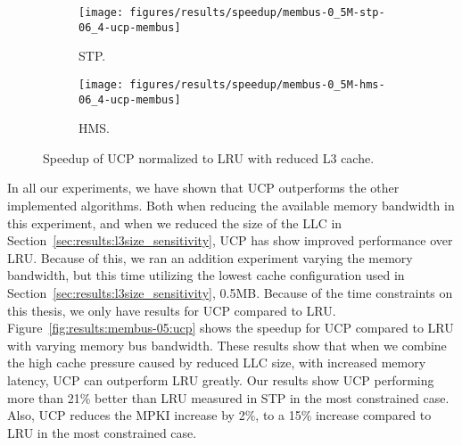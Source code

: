 \begin{figure}[t]
    \centering
        \begin{subfigure}[b]{0.5\textwidth}
            \texttt{[image: figures/results/speedup/membus-0\_5M-stp-06\_4-ucp-membus]}
            \caption{STP.}
            \label{fig:results:bus-05:ucp:stp}
        \end{subfigure}%
        \begin{subfigure}[b]{0.5\textwidth}
            \texttt{[image: figures/results/speedup/membus-0\_5M-hms-06\_4-ucp-membus]}
            \caption{HMS.}
            \label{fig:results:bus-05:ucp:hms}
        \end{subfigure}
        \label{fig:results:bus-05:ucp}
        \caption{Speedup of UCP normalized to LRU with reduced L3 cache.}
\end{figure}


In all our experiments, we have shown that UCP outperforms the other implemented algorithms.
Both when reducing the available memory bandwidth in this experiment, and when we reduced the size of the LLC in Section~\ref{sec:results:l3size_sensitivity}, UCP has show improved performance over LRU.
Because of this, we ran an addition experiment varying the memory bandwidth, but this time utilizing the lowest cache configuration used in Section~\ref{sec:results:l3size_sensitivity}, 0.5MB.
Because of the time constraints on this thesis, we only have results for UCP compared to LRU.
Figure~\ref{fig:results:membus-05:ucp} shows the speedup for UCP compared to LRU with varying memory bus bandwidth.
These results show that when we combine the high cache pressure caused by reduced LLC size, with increased memory latency, UCP can outperform LRU greatly.
Our results show UCP performing more than 21\% better than LRU measured in STP in the most constrained case.
Also, UCP reduces the MPKI increase by 2\%, to a 15\% increase compared to LRU in the most constrained case.
